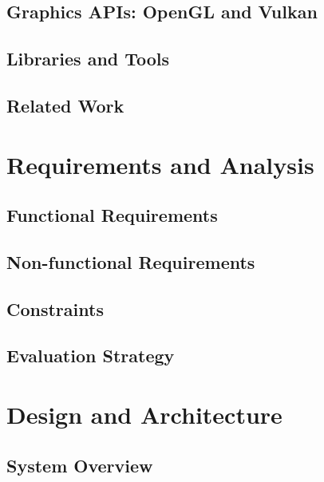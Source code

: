 \documentclass[12pt,a4paper,openright,twoside]{book}
\begin{document}
\section{Graphics APIs: OpenGL and Vulkan}

\section{Libraries and Tools}

\section{Related Work}

\chapter{Requirements and Analysis}
\label{chap:analysis}

\section{Functional Requirements}

\section{Non-functional Requirements}

\section{Constraints}

\section{Evaluation Strategy}

\chapter{Design and Architecture}
\label{chap:design}

\section{System Overview}
\end{document}
